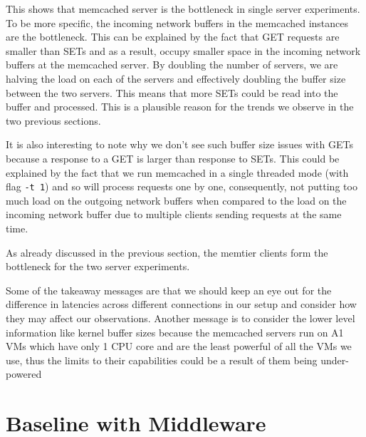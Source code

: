 \documentclass[11pt,a4paper]{article}
\newcommand\instructions[1]{\textcolor{blue}{Instructions: #1}}
\begin{document}
This shows that memcached server is the bottleneck in single server experiments. To be more specific, the incoming network buffers in the memcached instances are the bottleneck. This can be explained by the fact that GET requests are smaller than SETs and as a result, occupy smaller space in the incoming network buffers at the memcached server. By doubling the number of servers, we are halving the load on each of the servers and effectively doubling the buffer size between the two servers. This means that more SETs could be read into the buffer and processed. This is a plausible reason for the trends we observe in the two previous sections.

It is also interesting to note why we don't see such buffer size issues with GETs because a response to a GET is larger than response to SETs. This could be explained by the fact that we run memcached in a single threaded mode (with flag \texttt{-t 1}) and so will process requests one by one, consequently, not putting too much load on the outgoing network buffers when compared to the load on the incoming network buffer due to multiple clients sending requests at the same time.

As already discussed in the previous section, the memtier clients form the bottleneck for the two server experiments.

Some of the takeaway messages are that we should keep an eye out for the difference in latencies across different connections in our setup and consider how they may affect our observations. Another message is to consider the lower level information like kernel buffer sizes because the memcached servers run on A1 VMs which have only 1 CPU core and are the least powerful of all the VMs we use, thus the limits to their capabilities could be a result of them being under-powered 


\section{Baseline with Middleware} %

\end{document}
